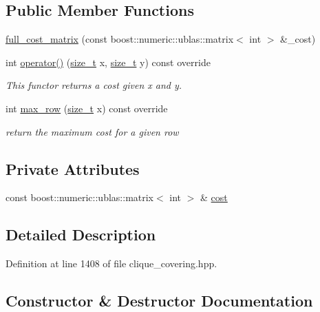 \subsection*{Public Member Functions}
\begin{DoxyCompactItemize}
\item 
\hyperlink{structfull__cost__matrix_a0273732aab379ee4dd115facd2e92ea6}{full\+\_\+cost\+\_\+matrix} (const boost\+::numeric\+::ublas\+::matrix$<$ int $>$ \&\+\_\+cost)
\item 
int \hyperlink{structfull__cost__matrix_a625adeda249e638a0ea9c702bb34c437}{operator()} (\hyperlink{tutorial__fpt__2017_2intro_2sixth_2test_8c_a7c94ea6f8948649f8d181ae55911eeaf}{size\+\_\+t} x, \hyperlink{tutorial__fpt__2017_2intro_2sixth_2test_8c_a7c94ea6f8948649f8d181ae55911eeaf}{size\+\_\+t} y) const override
\begin{DoxyCompactList}\small\item\em This functor returns a cost given x and y. \end{DoxyCompactList}\item 
int \hyperlink{structfull__cost__matrix_a742972fc40fef6f6a007f211e18d5034}{max\+\_\+row} (\hyperlink{tutorial__fpt__2017_2intro_2sixth_2test_8c_a7c94ea6f8948649f8d181ae55911eeaf}{size\+\_\+t} x) const override
\begin{DoxyCompactList}\small\item\em return the maximum cost for a given row \end{DoxyCompactList}\end{DoxyCompactItemize}
\subsection*{Private Attributes}
\begin{DoxyCompactItemize}
\item 
const boost\+::numeric\+::ublas\+::matrix$<$ int $>$ \& \hyperlink{structfull__cost__matrix_a96e016aafef40650768c051e2adeabce}{cost}
\end{DoxyCompactItemize}


\subsection{Detailed Description}


Definition at line 1408 of file clique\+\_\+covering.\+hpp.



\subsection{Constructor \& Destructor Documentation}
\mbox{\label{structfull__cost__matrix_a0273732aab379ee4dd115facd2e92ea6}} 

